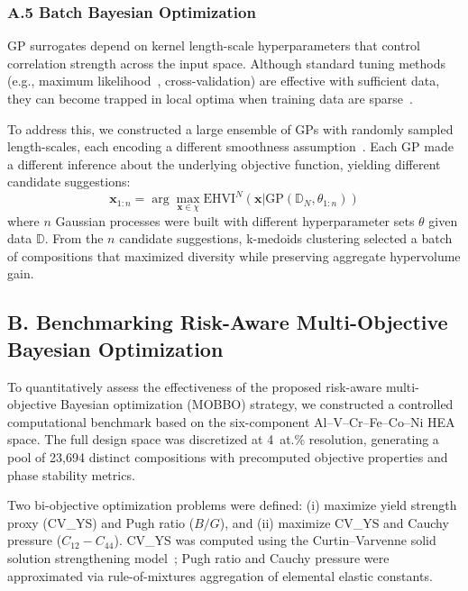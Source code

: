 \subsubsection*{A.5 Batch Bayesian Optimization}

GP surrogates depend on kernel length-scale hyperparameters that control correlation strength across the input space. Although standard tuning methods (e.g., maximum likelihood~\cite{Rasmussen:2005:GPM:1162254}, cross-validation) are effective with sufficient data, they can become trapped in local optima when training data are sparse~\cite{joy2020batch,couperthwaite2020materials}.

To address this, we constructed a large ensemble of GPs with randomly sampled length-scales, each encoding a different smoothness assumption~\cite{joy2020batch}. Each GP made a different inference about the underlying objective function, yielding different candidate suggestions:
\begin{equation}
    \textbf{x}_{1:n} = \arg\max_{\mathbf{x} \in \chi}  \textrm{EHVI}^{N}(\textbf{x} | \textrm{GP}(\mathbb{D}_N,\theta_{1:n}))
\end{equation}
where $n$ Gaussian processes were built with different hyperparameter sets $\theta$ given data $\mathbb{D}$. From the $n$ candidate suggestions, k-medoids clustering selected a batch of compositions that maximized diversity while preserving aggregate hypervolume gain.

\subsection*{B. Benchmarking Risk-Aware Multi-Objective Bayesian Optimization}
\label{sec:appendix_benchmark}

To quantitatively assess the effectiveness of the proposed risk-aware multi-objective Bayesian optimization (MOBBO) strategy, we constructed a controlled computational benchmark based on the six-component Al--V--Cr--Fe--Co--Ni HEA space. The full design space was discretized at 4~at.\% resolution, generating a pool of 23{,}694 distinct compositions with precomputed objective properties and phase stability metrics.

Two bi-objective optimization problems were defined:
(i) maximize yield strength proxy (CV\_YS) and Pugh ratio ($B/G$), and
(ii) maximize CV\_YS and Cauchy pressure ($C_{12} - C_{44}$).
CV\_YS was computed using the Curtin--Varvenne solid solution strengthening model~\cite{varvenne2016theory}; Pugh ratio and Cauchy pressure were approximated via rule-of-mixtures aggregation of elemental elastic constants.

